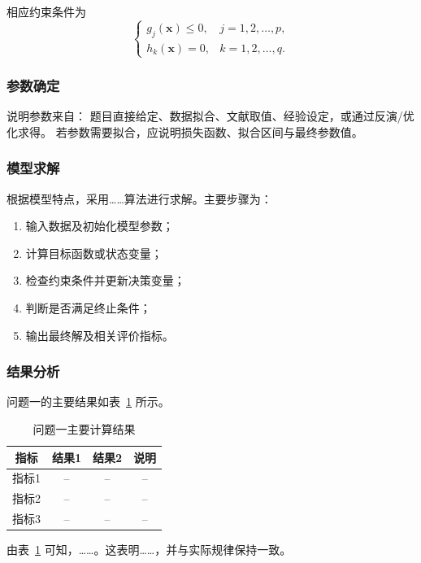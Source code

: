 \documentclass[UTF8,fontset=none,a4paper,12pt]{ctexart}
\begin{document}
相应约束条件为
\begin{equation}
\begin{cases}
  g_j(\bm{x})\le 0, & j=1,2,\ldots,p,\\
  h_k(\bm{x})=0, & k=1,2,\ldots,q.
\end{cases}
\label{eq:q1-constraint}
\end{equation}

\subsubsection{参数确定}

说明参数来自：
题目直接给定、数据拟合、文献取值、经验设定，或通过反演/优化求得。
若参数需要拟合，应说明损失函数、拟合区间与最终参数值。

\subsubsection{模型求解}

根据模型特点，采用……算法进行求解。主要步骤为：
\begin{enumerate}
  \item 输入数据及初始化模型参数；
  \item 计算目标函数或状态变量；
  \item 检查约束条件并更新决策变量；
  \item 判断是否满足终止条件；
  \item 输出最终解及相关评价指标。
\end{enumerate}

\subsubsection{结果分析}

问题一的主要结果如表~\ref{tab:q1-result} 所示。

\begin{table}[H]
  \centering
  \caption{问题一主要计算结果}
  \label{tab:q1-result}
  \begin{tabular}{cccc}
    \toprule
    指标 & 结果1 & 结果2 & 说明 \\
    \midrule
    指标1 & -- & -- & -- \\
    指标2 & -- & -- & -- \\
    指标3 & -- & -- & -- \\
    \bottomrule
  \end{tabular}
\end{table}

由表~\ref{tab:q1-result} 可知，……。这表明……，并与实际规律保持一致。
\end{document}
